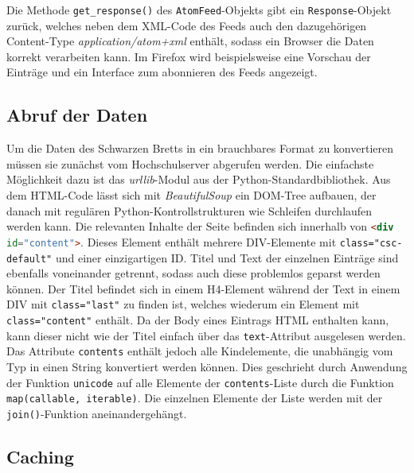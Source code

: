 Die Methode \lstinline{get_response()} des \lstinline{AtomFeed}-Objekts gibt ein
\lstinline{Response}-Objekt zurück, welches neben dem XML-Code des Feeds auch den dazugehörigen
Content-Type \emph{application/atom+xml} enthält, sodass ein Browser die Daten korrekt verarbeiten
kann. Im Firefox wird beispielsweise eine Vorschau der Einträge und ein Interface zum abonnieren des
Feeds angezeigt.


\subsection{Abruf der Daten}

Um die Daten des Schwarzen Bretts in ein brauchbares Format zu konvertieren müssen sie zunächst vom
Hochschulserver abgerufen werden. Die einfachste Möglichkeit dazu ist das \emph{urllib}-Modul aus
der Python-Standardbibliothek. Aus dem HTML-Code lässt sich mit \emph{BeautifulSoup} ein DOM-Tree
aufbauen, der danach mit regulären Python-Kontrollstrukturen wie Schleifen durchlaufen werden kann.
Die relevanten Inhalte der Seite befinden sich innerhalb von
\lstinline[language=HTML]{<div id="content">}. Dieses Element enthält mehrere DIV-Elemente mit
\lstinline[language=HTML]{class="csc-default"} und einer einzigartigen ID. Titel und Text der
einzelnen Einträge sind ebenfalls voneinander getrennt, sodass auch diese problemlos geparst werden
können. Der Titel befindet sich in einem H4-Element während der Text in einem DIV mit
\lstinline[language=HTML]{class="last"} zu finden ist, welches wiederum ein Element mit
\lstinline[language=HTML]{class="content"} enthält. Da der Body eines Eintrags HTML enthalten kann,
kann dieser nicht wie der Titel einfach über das \lstinline{text}-Attribut ausgelesen werden. Das
Attribute \lstinline{contents} enthält jedoch alle Kindelemente, die unabhängig vom Typ in einen
String konvertiert werden können. Dies geschrieht durch Anwendung der Funktion \lstinline{unicode}
auf alle Elemente der \lstinline{contents}-Liste durch die Funktion
\lstinline{map(callable, iterable)}. Die einzelnen Elemente der Liste werden mit der
\lstinline{join()}-Funktion aneinandergehängt.

\subsection{Caching}

